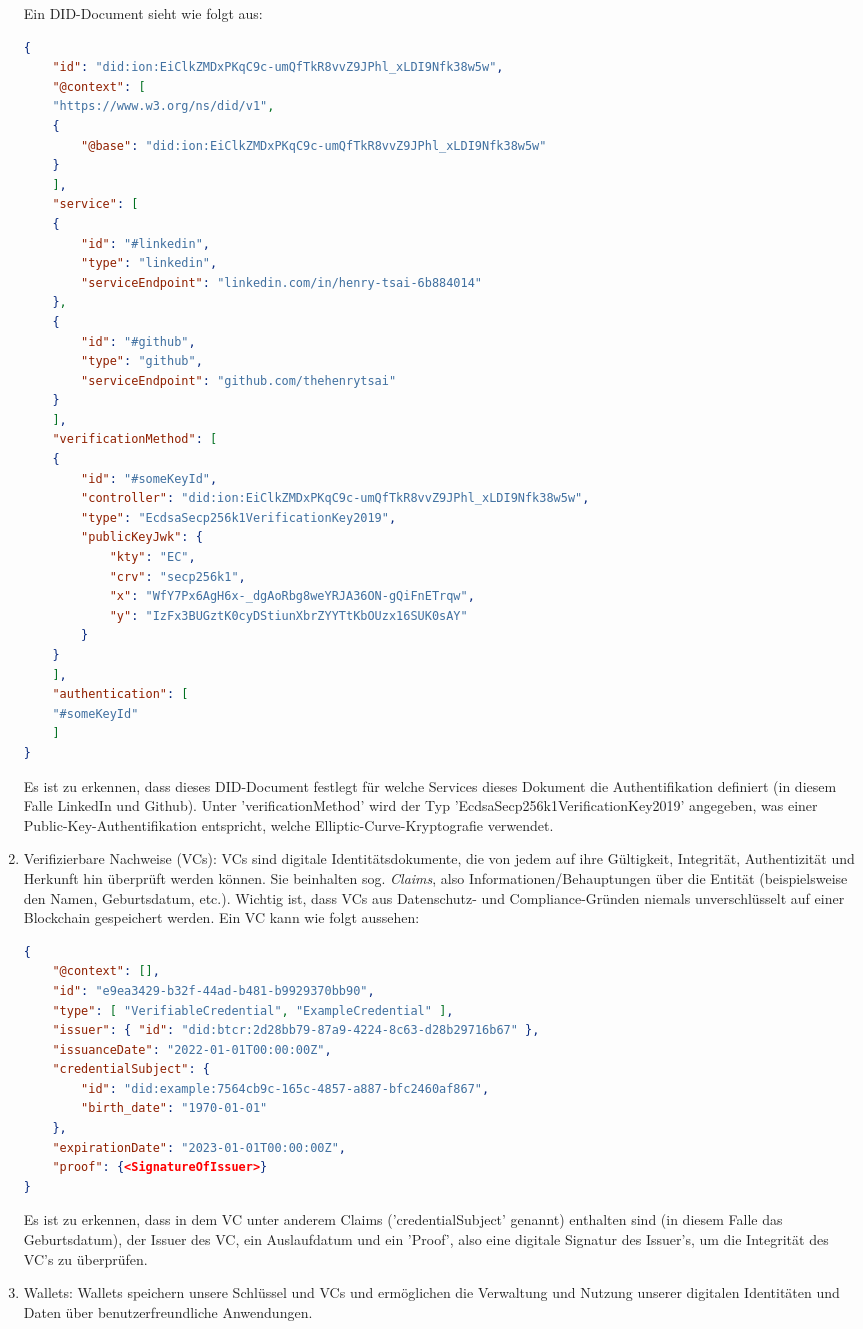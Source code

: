 \begin{enumerate}
	Ein DID-Document sieht wie folgt aus:
	\begin{lstlisting}[language=json,firstnumber=1]	
{
	"id": "did:ion:EiClkZMDxPKqC9c-umQfTkR8vvZ9JPhl_xLDI9Nfk38w5w",
	"@context": [
	"https://www.w3.org/ns/did/v1",
	{
		"@base": "did:ion:EiClkZMDxPKqC9c-umQfTkR8vvZ9JPhl_xLDI9Nfk38w5w"
	}
	],
	"service": [
	{
		"id": "#linkedin",
		"type": "linkedin",
		"serviceEndpoint": "linkedin.com/in/henry-tsai-6b884014"
	},
	{
		"id": "#github",
		"type": "github",
		"serviceEndpoint": "github.com/thehenrytsai"
	}
	],
	"verificationMethod": [
	{
		"id": "#someKeyId",
		"controller": "did:ion:EiClkZMDxPKqC9c-umQfTkR8vvZ9JPhl_xLDI9Nfk38w5w",
		"type": "EcdsaSecp256k1VerificationKey2019",
		"publicKeyJwk": {
			"kty": "EC",
			"crv": "secp256k1",
			"x": "WfY7Px6AgH6x-_dgAoRbg8weYRJA36ON-gQiFnETrqw",
			"y": "IzFx3BUGztK0cyDStiunXbrZYYTtKbOUzx16SUK0sAY"
		}
	}
	],
	"authentication": [
	"#someKeyId"
	]
}
	\end{lstlisting}
	
	Es ist zu erkennen, dass dieses DID-Document festlegt für welche Services dieses Dokument die Authentifikation definiert (in diesem Falle LinkedIn und Github). Unter 'verificationMethod' wird der Typ 'EcdsaSecp256k1VerificationKey2019' angegeben, was einer Public-Key-Authentifikation entspricht, welche Elliptic-Curve-Kryptografie verwendet.
	
	\item Verifizierbare Nachweise (VCs): VCs sind digitale Identitätsdokumente, die von jedem auf ihre Gültigkeit, Integrität, Authentizität und Herkunft hin überprüft werden können. Sie beinhalten sog. \textsl{Claims}, also Informationen/Behauptungen über die Entität (beispielsweise den Namen, Geburtsdatum, etc.). Wichtig ist, dass VCs aus Datenschutz- und Compliance-Gründen niemals unverschlüsselt auf einer Blockchain gespeichert werden. Ein VC kann wie folgt aussehen:
	
	\begin{lstlisting}[language=json,firstnumber=1]
{
	"@context": [],
	"id": "e9ea3429-b32f-44ad-b481-b9929370bb90",
	"type": [ "VerifiableCredential", "ExampleCredential" ],
	"issuer": { "id": "did:btcr:2d28bb79-87a9-4224-8c63-d28b29716b67" },
	"issuanceDate": "2022-01-01T00:00:00Z",
	"credentialSubject": {
		"id": "did:example:7564cb9c-165c-4857-a887-bfc2460af867",
		"birth_date": "1970-01-01"
	},
	"expirationDate": "2023-01-01T00:00:00Z",
	"proof": {<SignatureOfIssuer>}
}
	\end{lstlisting}
	
	Es ist zu erkennen, dass in dem VC unter anderem Claims ('credentialSubject' genannt) enthalten sind (in diesem Falle das Geburtsdatum), der Issuer des VC, ein Auslaufdatum und ein 'Proof', also eine digitale Signatur des Issuer's, um die Integrität des VC's zu überprüfen.
	
	\item Wallets: Wallets speichern unsere Schlüssel und VCs und ermöglichen die Verwaltung und Nutzung unserer digitalen Identitäten und Daten über benutzerfreundliche Anwendungen.
\end{enumerate}

